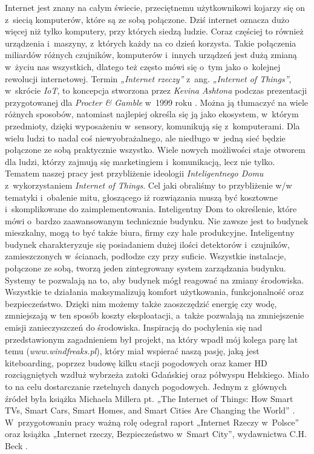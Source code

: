 \documentclass{xmgr}
\begin{document}
\maketitle
\introduction
	Internet jest znany na całym świecie, przeciętnemu użytkownikowi kojarzy się on z~siecią komputerów, które są ze sobą połączone. Dziś internet oznacza dużo więcej niż tylko komputery, przy których siedzą ludzie. Coraz częściej to również urządzenia i~maszyny, z~których każdy na co dzień korzysta. Takie połączenia miliardów różnych czujników, komputerów i~innych urządzeń jest dużą zmianą w~życiu nas wszystkich, dlatego też często mówi się o~tym jako o~kolejnej rewolucji internetowej.
	Termin \emph{„Internet rzeczy”} z~ang. \emph{„Internet of Things”}, w~skrócie \emph{IoT}, to koncepcja stworzona przez \emph{Kevina Ashtona} podczas prezentacji przygotowanej dla \emph{Procter \& Gamble} w~1999 roku \cite{KA:2009:iot}. Można ją tłumaczyć na wiele różnych sposobów, natomiast najlepiej określa się ją jako ekosystem, w~którym przedmioty, dzięki wyposażeniu w~sensory, komunikują się z~komputerami. Dla wielu ludzi to nadal coś niewyobrażalnego, ale niedługo w~jedną sieć będzie połączone ze sobą praktycznie wszystko. Wiele nowych możliwości staje otworem dla ludzi, którzy zajmują się marketingiem i~komunikacją, lecz nie tylko. 
	Tematem naszej pracy jest przybliżenie ideologii \emph{Inteligentnego Domu} z~wykorzystaniem \emph{Internet of Things}. Cel jaki obraliśmy to przybliżenie w/w tematyki i~obalenie mitu, głoszącego iż rozwiązania muszą być kosztowne i~skomplikowane do zaimplementowania. Inteligentny Dom to określenie, które mówi o~bardzo zaawansowanym technicznie budynku. Nie zawsze jest to budynek mieszkalny, mogą to być także  biura, firmy czy hale produkcyjne. 
	Inteligentny budynek charakteryzuje się posiadaniem dużej ilości detektorów i~czujników, zamieszczonych w~ścianach, podłodze czy przy suficie. Wszystkie instalacje, połączone ze sobą, tworzą jeden zintegrowany system zarządzania budynku. Systemy te pozwalają na to, aby budynek mógł reagować na zmiany środowiska. Wszystkie te działania maksymalizują komfort użytkowania, funkcjonalność oraz bezpieczeństwo. Dzięki nim możemy także zaoszczędzić energię czy wodę, zmniejszają w ten sposób koszty eksploatacji, a~także pozwalają na zmniejszenie emisji zanieczyszczeń do środowiska. 
	Inspiracją do pochylenia się nad przedstawionym zagadnieniem był projekt, na który wpadł mój kolega parę lat temu (\emph{www.windfreaks.pl}), który miał wspierać naszą pasję, jaką jest kiteboarding, poprzez budowę kilku stacji pogodowych oraz kamer HD rozciągniętych wzdłuż wybrzeża zatoki Gdańskiej oraz półwyspu Helskiego. Miało to na celu dostarczanie rzetelnych danych pogodowych. Jednym z~głównych źródeł była książka Michaela Millera pt. „The Internet of Things: How Smart TVs, Smart Cars, Smart Homes, and Smart Cities Are Changing the World” \cite{MM:2015:TIOT}. W~przygotowaniu pracy ważną rolę odegrał raport „Internet Rzeczy w~Polsce” \cite{RP:2015:IOTPL} oraz książka „Internet rzeczy, Bezpieczeństwo w~Smart City”, wydawnictwa C.H. Beck \cite{beck}. 
\end{document}

